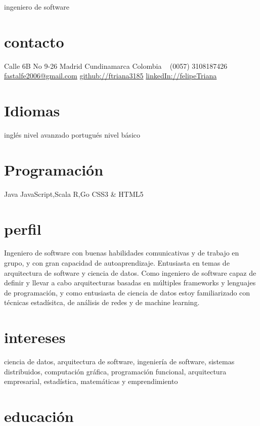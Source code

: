 \documentclass[]{friggeri-cv}
\begin{document}
       {ingeniero de software}


\begin{aside}
  \section{contacto}
    Calle 6B No 9-26
    Madrid Cundinamarca
    Colombia
    ~
    (0057) 3108187426
    ~
    \href{mailto:fastalfe2006@gmail.com}{fastalfe2006@gmail.com}
    \href{https://github.com/ftriana3185}{github://ftriana3185}
    \href{http://co.linkedin.com/pub/felipe-triana-casta%C3%B1eda/55/bb9/4a}{linkedIn://felipeTriana}
  \section{Idiomas}
    inglés nivel avanzado
    portugués nivel básico
  \section{Programación}
    Java
    JavaScript,Scala
    R,Go
    CSS3 \& HTML5
\end{aside}

\section{perfil}

Ingeniero de software con buenas habilidades comunicativas y de trabajo en grupo, y con gran capacidad de autoaprendizaje. Entusiasta en temas de arquitectura de software y ciencia de datos. Como ingeniero de software capaz de definir y llevar a cabo arquitecturas basadas en múltiples frameworks y lenguajes de programación, y como entusiasta de ciencia de datos estoy familiarizado con técnicas estadísitca, de análisis de redes y de machine learning.   

\section{intereses}

ciencia de datos, arquitectura de software, ingeniería de software, sistemas distribuidos, computación gráfica, programación funcional, arquitectura empresarial, estadística, matemáticas y emprendimiento 

\section{educación}
\end{document}
